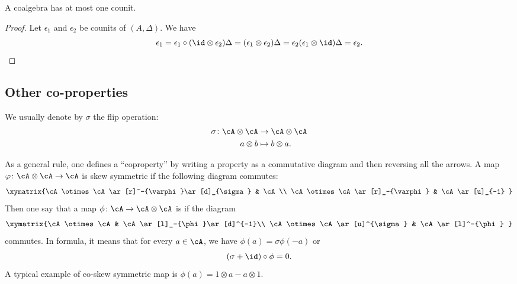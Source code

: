 \begin{lemma}       \label{LemUnicityCounit}
	A coalgebra has at most one counit.
\end{lemma}

\begin{proof}
	Let \( \epsilon_1\) and \( \epsilon_2\) be counits of \( (A,\Delta)\). We have
	\begin{equation}
		\epsilon_1=\epsilon_1\circ(\id\otimes\epsilon_2)\Delta
		=(\epsilon_1\otimes\epsilon_2)\Delta
		=\epsilon_2(\epsilon_1\otimes\id)\Delta
		=\epsilon_2.
	\end{equation}
\end{proof}


\subsection{Other co-properties}
\label{subSecOtherCoPropoerties}

We usually denote by \( \sigma\) the flip operation:
\begin{equation}
	\begin{aligned}
		\sigma\colon \cA\otimes\cA & \to \cA\otimes\cA   \\
		a\otimes b                 & \mapsto b\otimes a.
	\end{aligned}
\end{equation}

As a general rule, one defines a ``coproperty'' by writing a property as a commutative diagram and then reversing all the arrows. A map \( \varphi\colon \cA\otimes\cA\to \cA\) is skew symmetric if the following diagram commutes:
\begin{equation}
	\xymatrix{%
	\cA\otimes\cA \ar[r]^-{\varphi}\ar[d]_{\sigma}        &   \cA\\
	\cA\otimes\cA \ar[r]_-{\varphi}   &   \cA\ar[u]_{-1}
	}
\end{equation}
Then one say that a map \( \phi\colon \cA\to \cA\otimes\cA\) is  if the diagram
\begin{equation}
	\xymatrix{%
	\cA\otimes\cA       &   \cA\ar[l]_-{\phi}\ar[d]^{-1}\\
	\cA\otimes\cA\ar[u]^{\sigma}   &     \cA\ar[l]^-{\phi}
	}
\end{equation}
commutes. In formula, it means that for every \( a\in\cA\), we have \( \phi(a)=\sigma\phi(-a)\) or
\begin{equation}        \label{EqDefCoSkewSym}
	(\sigma+\id)\circ\phi=0.
\end{equation}
A typical example of co-skew symmetric map is \( \phi(a)=1\otimes a-a\otimes 1\).

